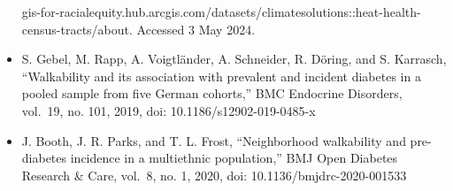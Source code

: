 \documentclass[
]{article}
\begin{document}
\begin{itemize}
  gis-for-racialequity.hub.arcgis.com/datasets/climatesolutions::heat-health-census-tracts/about.
  Accessed 3 May 2024.
\item
  S. Gebel, M. Rapp, A. Voigtländer, A. Schneider, R. Döring, and S.
  Karrasch, ``Walkability and its association with prevalent and
  incident diabetes in a pooled sample from five German cohorts,'' BMC
  Endocrine Disorders, vol.~19, no. 101, 2019, doi:
  10.1186/s12902-019-0485-x
\item
  J. Booth, J. R. Parks, and T. L. Frost, ``Neighborhood walkability and
  pre-diabetes incidence in a multiethnic population,'' BMJ Open
  Diabetes Research \& Care, vol.~8, no. 1, 2020, doi:
  10.1136/bmjdrc-2020-001533
\end{itemize}
\end{document}
